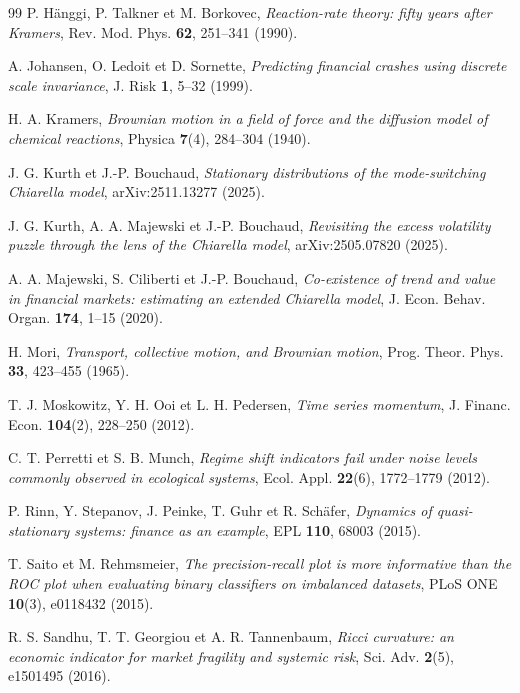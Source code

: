 \documentclass[11pt,a4paper]{article}
\begin{document}
\begin{thebibliography}{99}
P. H\"anggi, P. Talkner et M. Borkovec, \emph{Reaction-rate theory: fifty years after Kramers}, Rev. Mod. Phys. \textbf{62}, 251--341 (1990).

A. Johansen, O. Ledoit et D. Sornette, \emph{Predicting financial crashes using discrete scale invariance}, J. Risk \textbf{1}, 5--32 (1999).

H. A. Kramers, \emph{Brownian motion in a field of force and the diffusion model of chemical reactions}, Physica \textbf{7}(4), 284--304 (1940).

J. G. Kurth et J.-P. Bouchaud, \emph{Stationary distributions of the mode-switching Chiarella model}, arXiv:2511.13277 (2025).

J. G. Kurth, A. A. Majewski et J.-P. Bouchaud, \emph{Revisiting the excess volatility puzzle through the lens of the Chiarella model}, arXiv:2505.07820 (2025).

A. A. Majewski, S. Ciliberti et J.-P. Bouchaud, \emph{Co-existence of trend and value in financial markets: estimating an extended Chiarella model}, J. Econ. Behav. Organ. \textbf{174}, 1--15 (2020).

H. Mori, \emph{Transport, collective motion, and Brownian motion}, Prog. Theor. Phys. \textbf{33}, 423--455 (1965).

T. J. Moskowitz, Y. H. Ooi et L. H. Pedersen, \emph{Time series momentum}, J. Financ. Econ. \textbf{104}(2), 228--250 (2012).

C. T. Perretti et S. B. Munch, \emph{Regime shift indicators fail under noise levels commonly observed in ecological systems}, Ecol. Appl. \textbf{22}(6), 1772--1779 (2012).

P. Rinn, Y. Stepanov, J. Peinke, T. Guhr et R. Sch\"afer, \emph{Dynamics of quasi-stationary systems: finance as an example}, EPL \textbf{110}, 68003 (2015).

T. Saito et M. Rehmsmeier, \emph{The precision-recall plot is more informative than the ROC plot when evaluating binary classifiers on imbalanced datasets}, PLoS ONE \textbf{10}(3), e0118432 (2015).

R. S. Sandhu, T. T. Georgiou et A. R. Tannenbaum, \emph{Ricci curvature: an economic indicator for market fragility and systemic risk}, Sci. Adv. \textbf{2}(5), e1501495 (2016).


\end{thebibliography}
\end{document}
